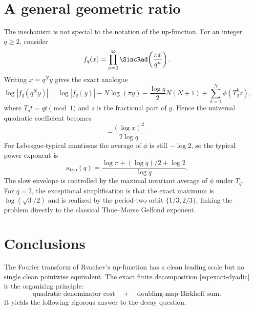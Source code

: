 \documentclass[11pt,oneside]{article}
\theoremstyle{definition}
\theoremstyle{remark}
\begin{document}
\section{A general geometric ratio}

The mechanism is not special to the notation of the up-function.  For an
integer $q\ge2$, consider
\begin{equation}
 f_q(x)=\prod_{n=0}^{\infty}
 \SincRad\!\left(\frac{\pi x}{q^n}\right).                    \label{eq:fq}
\end{equation}
Writing $x=q^Ny$ gives the exact analogue
\begin{equation}
 \log|f_q(q^Ny)|
 =\log|f_q(y)|-N\log(\pi y)
 -\frac{\log q}{2}N(N+1)
 +\sum_{k=1}^{N}\phi(T_q^kz),                              \label{eq:q-decomp}
\end{equation}
where $T_qt=qt\pmod1$ and $z$ is the fractional part of $y$.  Hence the
universal quadratic coefficient becomes
\begin{equation}
 -\frac{(\log x)^2}{2\log q}.                              \label{eq:q-leading}
\end{equation}
For Lebesgue-typical mantissas the average of $\phi$ is still $-\log2$, so the
typical power exponent is
\begin{equation}
 \kappa_{\mathrm{typ}}(q)
 =\frac{\log\pi+(\log q)/2+\log2}{\log q}.                 \label{eq:q-typ}
\end{equation}
The slow envelope is controlled by the maximal invariant average of $\phi$
under $T_q$.  For $q=2$, the exceptional simplification is that the exact
maximum is $\log(\sqrt3/2)$ and is realized by the period-two orbit
$\{1/3,2/3\}$, linking the problem directly to the classical Thue--Morse
Gelfond exponent.

\section{Conclusions}

The Fourier transform of Rvachev's up-function has a clean leading scale but no
single clean pointwise equivalent.  The exact finite decomposition
\eqref{eq:exact-dyadic} is the organizing principle:
\begin{equation*}
 \text{quadratic denominator cost}
 \quad+\quad
 \text{doubling-map Birkhoff sum}.
\end{equation*}
It yields the following rigorous answer to the decay question.
\end{document}
